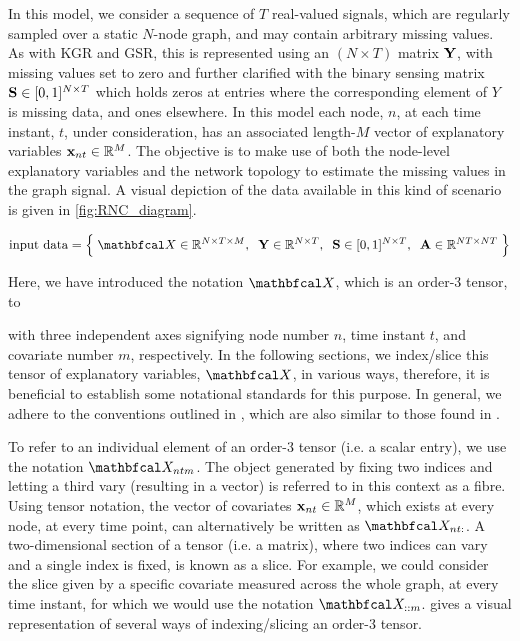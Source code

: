 In this model, we consider a sequence of $T$ real-valued signals, which are regularly sampled over a static $N$-node graph, and may contain arbitrary missing values. As with KGR and GSR, this is represented using an $(N \times T)$ matrix $\mathbf{Y}$, with missing values set to zero and further clarified with the binary sensing matrix $\mathbf{S} \in [0, 1]^{N \times T}$ which holds zeros at entries where the corresponding element of $Y$ is missing data, and ones elsewhere. In this model each node, $n$, at each time instant, $t$, under consideration, has an associated length-$M$ vector of explanatory variables $\mathbf{x}_{nt} \in \mathbb{R}^{M}$. The objective is to make use of both the node-level explanatory variables and the network topology to estimate the missing values in the graph signal. A visual depiction of the data available in this kind of scenario is given in \cref{fig:RNC_diagram}. 

\begin{equation*}
    \text{input data} = \Big\{ \;\Xt \in \R^{N \times T \times M}, \;\; \Y \in \R^{N \times T}, \;\; \Ss \in [0, 1]^{N \times T}, \;\; \A \in \R^{NT \times NT} \; \Big\}
\end{equation*}

Here, we have introduced the notation $\Xt$, which is an order-3 tensor, to 

with three independent axes signifying node number $n$, time instant $t$, and covariate number $m$, respectively. In the following sections, we index/slice this tensor of explanatory variables, $\Xt$, in various ways, therefore, it is beneficial to establish some notational standards for this purpose. In general, we adhere to the conventions outlined in \cite{Kolda2009}, which are also similar to those found in \cite{Kiers2000}. 

To refer to an individual element of an order-3 tensor (i.e. a scalar entry), we use the notation $\Xt_{ntm}$. The object generated by fixing two indices and letting a third vary (resulting in a vector) is referred to in this context as a fibre. Using tensor notation, the vector of covariates $\mathbf{x}_{nt} \in \mathbb{R}^{M}$, which exists at every node, at every time point, can alternatively be written as $\Xt_{nt:}$. A two-dimensional section of a tensor (i.e. a matrix), where two indices can vary and a single index is fixed, is known as a slice. For example, we could consider the slice given by a specific covariate measured across the whole graph, at every time instant, for which we would use the notation $\Xt_{::m}$.  gives a visual representation of several ways of indexing/slicing an order-3 tensor. 


